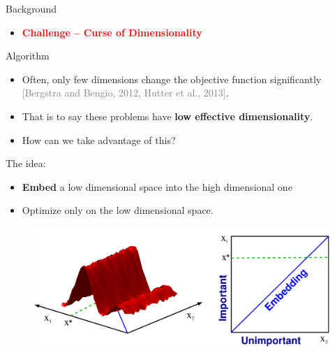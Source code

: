 \documentclass[final]{beamer}
\begin{document}
\begin{frame}[t]
\begin{columns}[T]
\begin{column}{.48\textwidth}
\begin{block}{Background}
    
 \begin{itemize}
    \item {\bf \textcolor{red}{ Challenge -- Curse of Dimensionality}}
   \end{itemize}
\end{block}

\begin{block}{Algorithm}

     \begin{itemize}
      \item Often, only few dimensions change the objective function significantly
       \textcolor{gray}{[Bergstra and Bengio, 2012, Hutter et al., 2013]}.
      \item That is to say these problems have 
       {\bf \textcolor{myColor}{low effective dimensionality}}.
       \item How can we take advantage of this?
     \end{itemize}

    
    The idea:
   \begin{itemize}
    \item {\bf \textcolor{myColor}{Embed}} 
     a low dimensional space into the high dimensional one
    \item Optimize
     only on the low dimensional space.
   \end{itemize}

  \begin{figure}[t]
   \includegraphics[width = 0.9\columnwidth]
   {../paper/figures/2to1embedding}
   \label{fig:ESSL_BLR}
  \end{figure}
  

\end{block}
\end{column}
\end{columns}
\end{frame}
\end{document}

